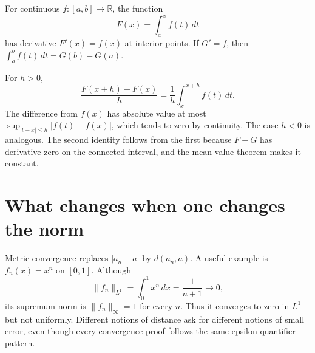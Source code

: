 \begin{theorem}
For continuous \(f:[a,b]\to\mathbb R\), the function
\[
 F(x)=\int_a^x f(t)\,dt
\]
has derivative \(F'(x)=f(x)\) at interior points. If \(G'=f\), then \(\int_a^b f(t)\,dt=G(b)-G(a)\).
\end{theorem}

For \(h>0\),
\[
 \frac{F(x+h)-F(x)}h=\frac1h\int_x^{x+h}f(t)\,dt.
\]
The difference from \(f(x)\) has absolute value at most \(\sup_{|t-x|\le h}|f(t)-f(x)|\), which tends to zero by continuity. The case \(h<0\) is analogous. The second identity follows from the first because \(F-G\) has derivative zero on the connected interval, and the mean value theorem makes it constant.

\section{What changes when one changes the norm}

Metric convergence replaces \(|a_n-a|\) by \(d(a_n,a)\). A useful example is \(f_n(x)=x^n\) on \([0,1]\). Although
\[
 \|f_n\|_{L^1}=\int_0^1x^n\,dx=\frac1{n+1}\to0,
\]
its supremum norm is \(\|f_n\|_\infty=1\) for every \(n\). Thus it converges to zero in \(L^1\) but not uniformly. Different notions of distance ask for different notions of small error, even though every convergence proof follows the same epsilon-quantifier pattern.
